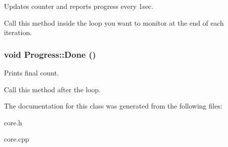 Updates counter and reports progress every 1sec. 

Call this method inside the loop you want to monitor at the end of each iteration. \hypertarget{classProgress_cabb2c4a989f7583dab1c75eb173ebf7}{
\subsubsection[Done]{\setlength{\rightskip}{0pt plus 5cm}void Progress::Done ()}}
\label{classProgress_cabb2c4a989f7583dab1c75eb173ebf7}


Prints final count. 

Call this method after the loop. 

The documentation for this class was generated from the following files:\begin{CompactItemize}
\item 
core.h\item 
core.cpp\end{CompactItemize}
